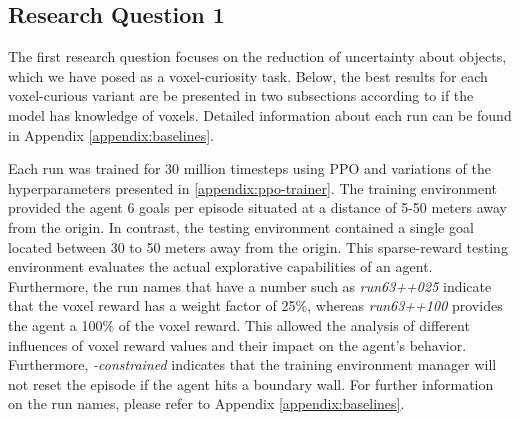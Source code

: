 
\subsection{Research Question 1}\label{chap:4:results-RQ1}

The first research question focuses on the reduction of uncertainty about objects, which we have posed as a voxel-curiosity task. Below, the best results for each voxel-curious variant are be presented in two subsections according to if the model has knowledge of voxels. Detailed information about each run can be found in Appendix \ref{appendix:baselines}.

Each run was trained for 30 million timesteps using PPO and variations of the hyperparameters presented in \ref{appendix:ppo-trainer}. The training environment provided the agent 6 goals per episode situated at a distance of 5-50 meters away from the origin. In contrast, the testing environment contained a single goal located between 30 to 50 meters away from the origin. This sparse-reward testing environment evaluates the actual explorative capabilities of an agent.
Furthermore, the run names that have a number such as \textit{run63++025} indicate that the voxel reward has a weight factor of 25\%, whereas \textit{run63++100} provides the agent a 100\% of the voxel reward. This allowed the analysis of different influences of voxel reward values and their impact on the agent's behavior. Furthermore, \textit{-constrained} indicates that the training environment manager will not reset the episode if the agent hits a boundary wall. For further information on the run names, please refer to Appendix \ref{appendix:baselines}.

\newpage

